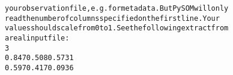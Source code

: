 {{\begin{tabbing}
{\texttt{your\hspace{6pt}observation\hspace{6pt}file,\hspace{6pt}e.g.\hspace{6pt}for\hspace{6pt}meta\hspace{6pt}data.\hspace{12pt}But\hspace{6pt}PySOM\hspace{6pt}will\hspace{6pt}only}}\\
{\texttt{read\hspace{6pt}the\hspace{6pt}number\hspace{6pt}of\hspace{6pt}columns\hspace{6pt}specified\hspace{6pt}on\hspace{6pt}the\hspace{6pt}first\hspace{6pt}line.\hspace{6pt}Your}}\\
{\texttt{values\hspace{6pt}should\hspace{6pt}scale\hspace{6pt}from\hspace{6pt}0\hspace{6pt}to\hspace{6pt}1.\hspace{12pt}See\hspace{6pt}the\hspace{6pt}following\hspace{6pt}extract\hspace{6pt}from}}\\
{\texttt{a\hspace{6pt}real\hspace{6pt}input\hspace{6pt}file:}}\\
{\texttt{3}}\\
{\texttt{0.847\hspace{6pt}0.508\hspace{6pt}0.573\hspace{6pt}1}}\\
{\texttt{0.597\hspace{6pt}0.417\hspace{6pt}0.093\hspace{6pt}6}}\\

\end{tabbing}}}
